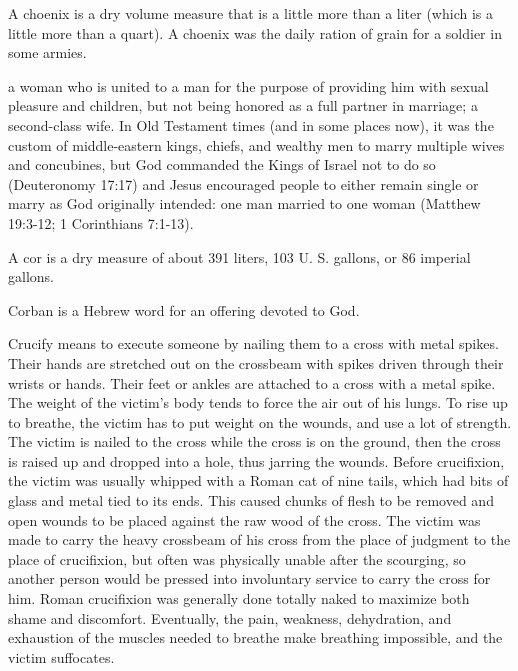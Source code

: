 {\par }{\ILIB A choenix is a dry volume measure that is a little more than a liter (which is a little more than a quart). A choenix was the daily ration of grain for a soldier in some armies.
\par }{
\par }{\ILIB a woman who is united to a man for the purpose of providing him with sexual pleasure and children, but not being honored as a full partner in marriage; a second-class wife. In Old Testament times (and in some places now), it was the custom of middle-eastern kings, chiefs, and wealthy men to marry multiple wives and concubines, but God commanded the Kings of Israel not to do so (Deuteronomy 17:17) and Jesus encouraged people to either remain single or marry as God originally intended: one man married to one woman (Matthew 19:3-12; 1 Corinthians 7:1-13).
\par }{
\par }{\ILIB A cor is a dry measure of about 391 liters, 103 U. S. gallons, or 86 imperial gallons.
\par }{
\par }{\ILIB Corban is a Hebrew word for an offering devoted to God.
\par }{
\par }{\ILIB Crucify means to execute someone by nailing them to a cross with metal spikes. Their hands are stretched out on the crossbeam with spikes driven through their wrists or hands. Their feet or ankles are attached to a cross with a metal spike. The weight of the victim’s body tends to force the air out of his lungs. To rise up to breathe, the victim has to put weight on the wounds, and use a lot of strength. The victim is nailed to the cross while the cross is on the ground, then the cross is raised up and dropped into a hole, thus jarring the wounds. Before crucifixion, the victim was usually whipped with a Roman cat of nine tails, which had bits of glass and metal tied to its ends. This caused chunks of flesh to be removed and open wounds to be placed against the raw wood of the cross. The victim was made to carry the heavy crossbeam of his cross from the place of judgment to the place of crucifixion, but often was physically unable after the scourging, so another person would be pressed into involuntary service to carry the cross for him. Roman crucifixion was generally done totally naked to maximize both shame and discomfort. Eventually, the pain, weakness, dehydration, and exhaustion of the muscles needed to breathe make breathing impossible, and the victim suffocates.
}
